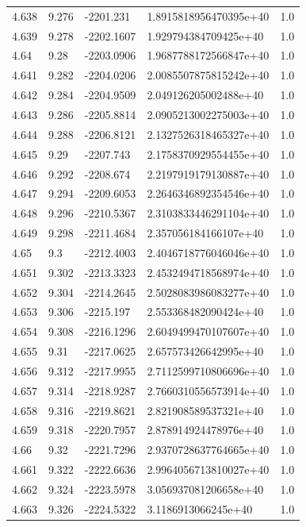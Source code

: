 \begin{tabular}{lllll}
4.638 & 9.276 & -2201.231 & 1.8915818956470395e+40 & 1.0 \\
4.639 & 9.278 & -2202.1607 & 1.929794384709425e+40 & 1.0 \\
4.64 & 9.28 & -2203.0906 & 1.9687788172566847e+40 & 1.0 \\
4.641 & 9.282 & -2204.0206 & 2.0085507875815242e+40 & 1.0 \\
4.642 & 9.284 & -2204.9509 & 2.049126205002488e+40 & 1.0 \\
4.643 & 9.286 & -2205.8814 & 2.0905213002275003e+40 & 1.0 \\
4.644 & 9.288 & -2206.8121 & 2.1327526318465327e+40 & 1.0 \\
4.645 & 9.29 & -2207.743 & 2.1758370929554455e+40 & 1.0 \\
4.646 & 9.292 & -2208.674 & 2.2197919179130887e+40 & 1.0 \\
4.647 & 9.294 & -2209.6053 & 2.2646346892354546e+40 & 1.0 \\
4.648 & 9.296 & -2210.5367 & 2.3103833446291104e+40 & 1.0 \\
4.649 & 9.298 & -2211.4684 & 2.357056184166107e+40 & 1.0 \\
4.65 & 9.3 & -2212.4003 & 2.4046718776046046e+40 & 1.0 \\
4.651 & 9.302 & -2213.3323 & 2.4532494718568974e+40 & 1.0 \\
4.652 & 9.304 & -2214.2645 & 2.5028083986083277e+40 & 1.0 \\
4.653 & 9.306 & -2215.197 & 2.553368482090424e+40 & 1.0 \\
4.654 & 9.308 & -2216.1296 & 2.6049499470107607e+40 & 1.0 \\
4.655 & 9.31 & -2217.0625 & 2.657573426642995e+40 & 1.0 \\
4.656 & 9.312 & -2217.9955 & 2.7112599710806696e+40 & 1.0 \\
4.657 & 9.314 & -2218.9287 & 2.7660310556573914e+40 & 1.0 \\
4.658 & 9.316 & -2219.8621 & 2.821908589537321e+40 & 1.0 \\
4.659 & 9.318 & -2220.7957 & 2.878914924478976e+40 & 1.0 \\
4.66 & 9.32 & -2221.7296 & 2.9370728637764665e+40 & 1.0 \\
4.661 & 9.322 & -2222.6636 & 2.9964056713810027e+40 & 1.0 \\
4.662 & 9.324 & -2223.5978 & 3.056937081206658e+40 & 1.0 \\
4.663 & 9.326 & -2224.5322 & 3.1186913066245e+40 & 1.0 \\

\end{tabular}
